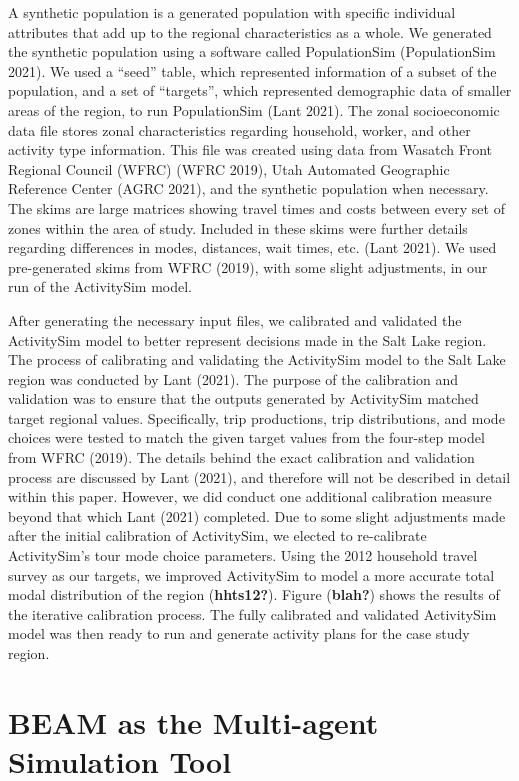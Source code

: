 \documentclass[12pt, oneside, openright]{byuthesis}
\begin{document}
A synthetic population is a generated population with specific individual attributes that add up to the regional characteristics as a whole. We generated the synthetic population using a software called PopulationSim (PopulationSim 2021). We used a ``seed'' table, which represented information of a subset of the population, and a set of ``targets'', which represented demographic data of smaller areas of the region, to run PopulationSim (Lant 2021). The zonal socioeconomic data file stores zonal characteristics regarding household, worker, and other activity type information. This file was created using data from Wasatch Front Regional Council (WFRC) (WFRC 2019), Utah Automated Geographic Reference Center (AGRC 2021), and the synthetic population when necessary. The skims are large matrices showing travel times and costs between every set of zones within the area of study. Included in these skims were further details regarding differences in modes, distances, wait times, etc. (Lant 2021). We used pre-generated skims from WFRC (2019), with some slight adjustments, in our run of the ActivitySim model.

After generating the necessary input files, we calibrated and validated the ActivitySim model to better represent decisions made in the Salt Lake region. The process of calibrating and validating the ActivitySim model to the Salt Lake region was conducted by Lant (2021). The purpose of the calibration and validation was to ensure that the outputs generated by ActivitySim matched target regional values. Specifically, trip productions, trip distributions, and mode choices were tested to match the given target values from the four-step model from WFRC (2019). The details behind the exact calibration and validation process are discussed by Lant (2021), and therefore will not be described in detail within this paper. However, we did conduct one additional calibration measure beyond that which Lant (2021) completed. Due to some slight adjustments made after the initial calibration of ActivitySim, we elected to re-calibrate ActivitySim's tour mode choice parameters. Using the 2012 household travel survey as our targets, we improved ActivitySim to model a more accurate total modal distribution of the region (\textbf{hhts12?}). Figure (\textbf{blah?}) shows the results of the iterative calibration process. The fully calibrated and validated ActivitySim model was then ready to run and generate activity plans for the case study region.

\hypertarget{meth-beam}{%
\section{BEAM as the Multi-agent Simulation Tool}\label{meth-beam}}
\end{document}
